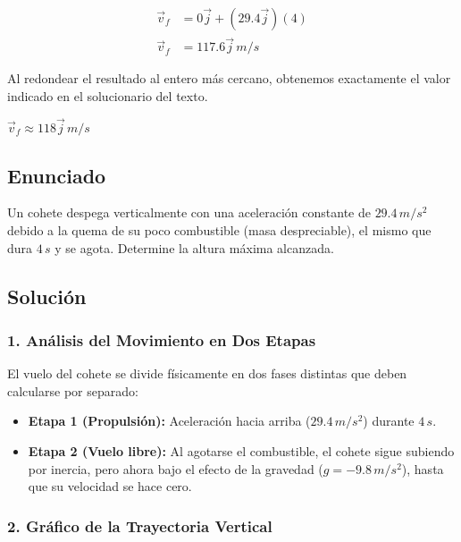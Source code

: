 \documentclass[12pt, a4paper]{article}
\begin{document}
\begin{align*}
\vec{v}_f &= 0\vec{j} + (29.4\vec{j})(4) \\
\vec{v}_f &= 117.6\vec{j} \, \si{m/s}
\end{align*}

Al redondear el resultado al entero más cercano, obtenemos exactamente el valor indicado en el solucionario del texto.

\begin{tcolorbox}[colback=green!5!white, colframe=green!50!black, title=Respuesta Final]
\centering \Large $\vec{v}_f \approx 118\vec{j} \, \si{m/s}$
\end{tcolorbox}

\newpage

\subsection*{Enunciado}
Un cohete despega verticalmente con una aceleración constante de $29.4 \, \si{m/s^2}$ debido a la quema de su poco combustible (masa despreciable), el mismo que dura $4 \, \si{s}$ y se agota. Determine la altura máxima alcanzada.

\subsection*{Solución}

\subsubsection*{1. Análisis del Movimiento en Dos Etapas}
El vuelo del cohete se divide físicamente en dos fases distintas que deben calcularse por separado:
\begin{itemize}
\item \textbf{Etapa 1 (Propulsión):} Aceleración hacia arriba ($29.4 \, \si{m/s^2}$) durante $4 \, \si{s}$.
\item \textbf{Etapa 2 (Vuelo libre):} Al agotarse el combustible, el cohete sigue subiendo por inercia, pero ahora bajo el efecto de la gravedad ($g = -9.8 \, \si{m/s^2}$), hasta que su velocidad se hace cero.
\end{itemize}

\subsubsection*{2. Gráfico de la Trayectoria Vertical}
\end{document}
